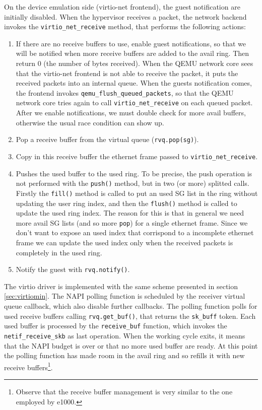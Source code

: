 On the device emulation side (virtio-net frontend), the guest notification are initially disabled.
When the hypervisor receives a packet, the network backend invokes the \texttt{virtio\_net\_receive} method, that performs the
following actions:
\begin{enumerate}
  \item If there are no receive buffers to use, enable guest notifications, so that we will be notified when more receive buffers
	are added to the avail ring. Then return 0 (the number of bytes received). When the QEMU network core sees that the virtio-net
	frontend is not able to receive the packet, it puts the received packets into an internal queue. When the guests notification
	comes, the frontend invokes \texttt{qemu\_flush\_queued\_packets}, so that the QEMU network core tries again to call
	\texttt{virtio\_net\_receive} on each queued packet.
	After we enable notifications, we must double check for more avail buffers, otherwise the usual race condition can show up.
  \item Pop a receive buffer from the virtual queue (\texttt{rvq.pop(sg)}).
  \item Copy in this receive buffer the ethernet frame passed to \texttt{virtio\_net\_receive}.
  \item Pushes the used buffer to the used ring. To be precise, the push operation is not performed with the \texttt{push()} method, 
	but in two (or more) splitted calls. Firstly the \texttt{fill()} method is called to put an used SG list in the ring without
	updating the user ring index, and then the \texttt{flush()} method is called to update the used ring index. The reason for this
	is that in general we need more avail SG lists (and so more \texttt{pop}) for a single ethernet frame. Since we don't want to
	expose an used index that corrispond to a incomplete ethernet frame we can update the used index only when the received packets
	is completely in the used ring.
  \item Notify the guest with \texttt{rvq.notify()}.
\end{enumerate}

\vspace{0.5cm}

The virtio driver is implemented with the same scheme presented in section \ref{sec:virtiomin}. The NAPI polling function is scheduled by
the receiver virtual queue callback, which also disable further callbacks. The polling function polls for used receive buffers calling
\texttt{rvq.get\_buf()}, that returns the \texttt{sk\_buff} token. Each used buffer is processed by the \texttt{receive\_buf} function,
which invokes the \texttt{netif\_receive\_skb} as last operation.
When the working cycle exits, it means that the NAPI budget is over or that no more used buffer are ready.
At this point the polling function has made room in the avail ring and so refills it with new receive buffers\footnote{Observe that the
receive buffer management is very similar to the one employed by e1000.}.

